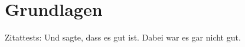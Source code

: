 \section{Grundlagen}
\label{sec:grundlagen}

Zitattests: 
Und \cite{king2006meta} sagte, dass es gut ist. Dabei war es gar nicht gut\parencite{behrenbruch2013understanding}. 

\lipsum[3]

\lipsum[4]
